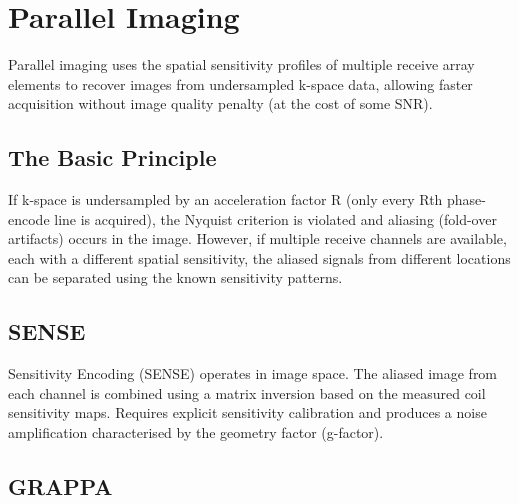 \section{Parallel Imaging}\label{sec:wiki_parallel_imaging}



Parallel imaging uses the spatial sensitivity profiles of multiple receive array elements to recover images from undersampled k-space data, allowing faster acquisition without image quality penalty (at the cost of some SNR).

				

\subsection{The Basic Principle}

				


				

If k-space is undersampled by an acceleration factor R (only every Rth phase-encode line is acquired), the Nyquist criterion is violated and aliasing (fold-over artifacts) occurs in the image. However, if multiple receive channels are available, each with a different spatial sensitivity, the aliased signals from different locations can be separated using the known sensitivity patterns.


				

\subsection{SENSE}

				

Sensitivity Encoding (SENSE) operates in image space. The aliased image from each channel is combined using a matrix inversion based on the measured coil sensitivity maps. Requires explicit sensitivity calibration and produces a noise amplification characterised by the geometry factor (g-factor).

				

\subsection{GRAPPA}

